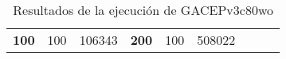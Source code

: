 \begin{table}[H]
\begin{tabular}{|ccrccrccc}
\multicolumn{1}{|c|}{\multirow{-39}{*}{\cellcolor[HTML]{FFFFC7}\textbf{100}}} & \multicolumn{1}{c|}{\multirow{-9}{*}{\cellcolor[HTML]{DDFDFF}100}} & \multicolumn{1}{r|}{\cellcolor[HTML]{DAE8FC}106343}    & \multicolumn{1}{c|}{\multirow{-39}{*}{\cellcolor[HTML]{FFFFC7}\textbf{200}}} & \multicolumn{1}{c|}{\multirow{-10}{*}{\cellcolor[HTML]{DDFDFF}100}} & \multicolumn{1}{r|}{\cellcolor[HTML]{DDFDFF}508022}    &                                                                              &                                                                    &                                                        \\ \cline{1-6}
\end{tabular}
\caption{\label{GACEPv3c80woGRASP}Resultados de la ejecución de GACEPv3c80wo}
\end{table}

